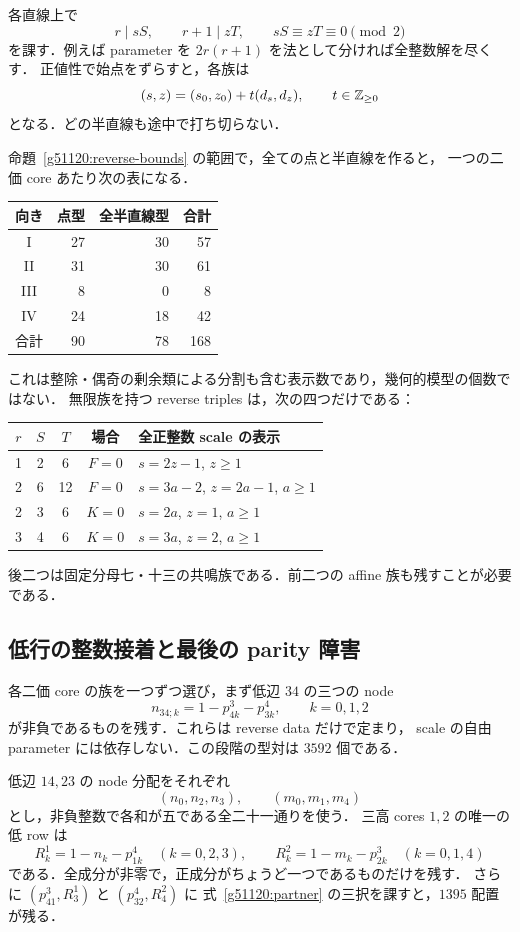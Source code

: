 各直線上で
\[
 r\mid sS,\qquad r+1\mid zT,\qquad
 sS\equiv zT\equiv0\pmod2
\]
を課す．例えば parameter を $2r(r+1)$ を法として分ければ全整数解を尽くす．
正値性で始点をずらすと，各族は
\begin{equation}\label{g51120:halfline}
 (s,z)=(s_0,z_0)+t(d_s,d_z),\qquad t\in\mathbb Z_{\ge0}
\end{equation}
となる．どの半直線も途中で打ち切らない．

命題~\ref{g51120:reverse-bounds} の範囲で，全ての点と半直線を作ると，
一つの二価 core あたり次の表になる．
\begin{center}\small
\begin{tabular}{crrr}
向き&点型&全半直線型&合計\\\hline
I&27&30&57\\
II&31&30&61\\
III&8&0&8\\
IV&24&18&42\\\hline
合計&90&78&168
\end{tabular}
\end{center}
これは整除・偶奇の剰余類による分割も含む表示数であり，幾何的模型の個数ではない．
無限族を持つ reverse triples は，次の四つだけである：
\begin{center}\small
\begin{tabular}{ccccl}
$r$&$S$&$T$&場合&全正整数 scale の表示\\\hline
1&2&6&$F=0$&$s=2z-1$, $z\ge1$\\
2&6&12&$F=0$&$s=3a-2$, $z=2a-1$, $a\ge1$\\
2&3&6&$K=0$&$s=2a$, $z=1$, $a\ge1$\\
3&4&6&$K=0$&$s=3a$, $z=2$, $a\ge1$
\end{tabular}
\end{center}
後二つは固定分母七・十三の共鳴族である．前二つの affine 族も残すことが必要である．

\subsection{低行の整数接着と最後の parity 障害}

各二価 core の族を一つずつ選び，まず低辺 $34$ の三つの node
\[
 n_{34;k}=1-p^3_{4k}-p^4_{3k},\qquad k=0,1,2
\]
が非負であるものを残す．これらは reverse data だけで定まり，
scale の自由 parameter には依存しない．この段階の型対は $3592$ 個である．

低辺 $14,23$ の node 分配をそれぞれ
\[
 (n_0,n_2,n_3),\qquad(m_0,m_1,m_4)
\]
とし，非負整数で各和が五である全二十一通りを使う．
三高 cores $1,2$ の唯一の低 row は
\begin{equation}\label{g51120:low-rows}
 R^1_k=1-n_k-p^4_{1k}\quad(k=0,2,3),\qquad
 R^2_k=1-m_k-p^3_{2k}\quad(k=0,1,4)
\end{equation}
である．全成分が非零で，正成分がちょうど一つであるものだけを残す．
さらに $(p^3_{41},R^1_3)$ と $(p^4_{32},R^2_4)$ に
式~\eqref{g51120:partner} の三択を課すと，$1395$ 配置が残る．

